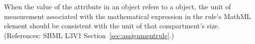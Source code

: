 When the value of the attribute  in an \AssignmentRule
object refers to a \Compartment object, the unit of measurement associated
with the mathematical expression in the rule's MathML  element
should be consistent with the unit of that compartment's size.
(References: SBML L3V1 Section~\ref{sec:assignmentrule}.)
